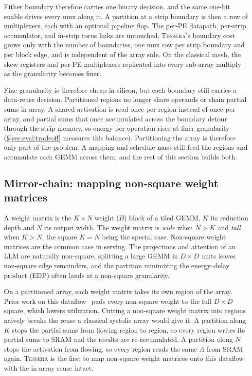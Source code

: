 Either boundary therefore carries one binary decision, and the
same one-bit enable drives every mux along it. A partition at a strip
boundary is then a row of multiplexers,
each with an optional pipeline flop. The per-PE datapath, per-strip
accumulator,
and in-strip torus links are untouched. \textsc{Tessera}'s boundary cost
grows only with the number of boundaries, one mux row per strip
boundary and per block edge, and is independent of the array side. On
the classical mesh, the skew registers and per-PE multiplexers
replicated into every sub-array multiply as the granularity
becomes finer.

Fine granularity is therefore cheap in silicon, but each
boundary still carries a data-reuse decision. Partitioned regions no longer
share operands or chain partial sums in-array. A shared
activation is read once per region instead of once per array, and
partial sums that once accumulated across the boundary detour through
the strip memory, so energy per operation rises at finer
granularity (\S\ref{sec:eval:tradeoff} measures this balance).
Partitioning the array is therefore only part of the problem. A
mapping and schedule must still feed the regions and accumulate
each GEMM across them, and the rest of this section builds both.

\subsection{Mirror-chain: mapping non-square weight matrices}
\label{sec:design:mapping}

A weight matrix is the $K{\times}N$ weight ($B$) block of a tiled GEMM,
$K$ its reduction depth and $N$ its output width. The weight matrix is
\emph{wide} when $N{>}K$ and \emph{tall} when $K{>}N$, the square
$K{=}N$ being the special case. Non-square weight matrices are the common case
in serving. The projections and attention of an LLM are naturally
non-square, splitting a large GEMM in $D{\times}D$ units leaves
non-square edge remainders, and the
partition minimizing the energy--delay product (EDP) often lands
at a non-square granularity.

On a partitioned array, each weight matrix takes its own region of the
array. Prior work on this
dataflow~\cite{Abdelmaksoud_2026} pads every non-square weight to the
full $D{\times}D$ square, which lowers utilization. Cutting a non-square weight matrix into regions naively
breaks the reuse a classical systolic array would give it. A partition along $K$
stops the partial sums from flowing region to region, so every
region writes its partial sums to SRAM and the results are
re-accumulated. A partition along $N$ stops the activation from flowing,
so every region reads the same $A$ from SRAM again. \textsc{Tessera} is the
first to map non-square weight matrices onto this dataflow with the in-array
reuse intact.

